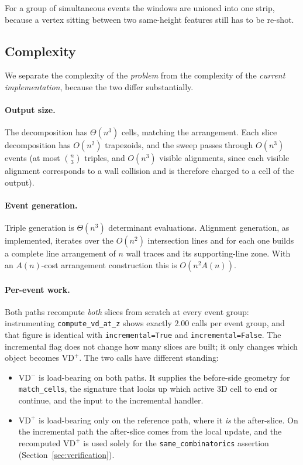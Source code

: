 \documentclass[11pt]{article}
\newcommand{\VD}{\mathrm{VD}}
\begin{document}
For a group of simultaneous events the windows are unioned into one strip,
because a vertex sitting between two same-height features still has to be
re-shot.

\subsection{Complexity}
\label{sec:complexity}

We separate the complexity of the \emph{problem} from the complexity of the
\emph{current implementation}, because the two differ substantially.

\paragraph{Output size.}
The decomposition has $\Theta(n^3)$ cells, matching the arrangement.  Each
slice decomposition has $O(n^2)$ trapezoids, and the sweep passes through
$O(n^3)$ events (at most $\binom{n}{3}$ triples, and $O(n^3)$ visible
alignments, since each visible alignment corresponds to a wall collision and is
therefore charged to a cell of the output).

\paragraph{Event generation.}
Triple generation is $\Theta(n^3)$ determinant evaluations.  Alignment
generation, as implemented, iterates over the $O(n^2)$ intersection lines and
for each one builds a complete line arrangement of $n$ wall traces and its
supporting-line zone.  With an $A(n)$-cost arrangement construction this is
$O(n^2 A(n))$.

\paragraph{Per-event work.}
Both paths recompute \emph{both} slices from scratch at every event group:
instrumenting \texttt{compute\_vd\_at\_z} shows exactly $2.00$ calls per event
group, and that figure is identical with \verb|incremental=True| and
\verb|incremental=False|.  The incremental flag does not change how many slices
are built; it only changes which object becomes $\VD^+$.  The two calls have
different standing:

\begin{itemize}
\item $\VD^-$ is load-bearing on both paths.  It supplies the before-side
  geometry for \texttt{match\_cells}, the signature that looks up which active
  3D cell to end or continue, and the input to the incremental handler.
\item $\VD^+$ is load-bearing only on the reference path, where it \emph{is}
  the after-slice.  On the incremental path the after-slice comes from the local
  update, and the recomputed $\VD^+$ is used solely for the
  \texttt{same\_combinatorics} assertion (Section~\ref{sec:verification}).
\end{itemize}
\end{document}
